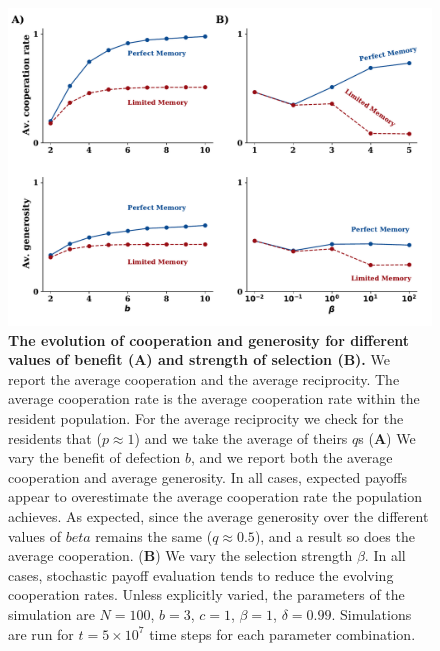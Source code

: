 \documentclass[11pt]{article}
\theoremstyle{plainCl1}
\theoremstyle{plainCl2}
\begin{document}
\begin{figure}[!htbp]
    \centering
    \includegraphics[width=\textwidth]{static/cooperation_rate_over_b_and_beta.pdf}
    \caption{{\bf The evolution of cooperation and generosity for different values
    of benefit (A) and strength of selection (B).} We report the
    average cooperation and the average reciprocity. The average cooperation rate
    is the average cooperation rate
    within the resident population. For the average reciprocity we check for the
    residents that ($p \approx 1$) and we take the average of theirs $q$s ({\bf A})
    We vary the benefit of defection $b$, and we report both the average
    cooperation and average generosity. In all cases, expected payoffs appear to
    overestimate the average cooperation rate the population achieves. As
    expected, since the average generosity over the different values of $beta$
    remains the same ($q \approx 0.5$), and a result so does the average
    cooperation. ({\bf B}) We vary the selection strength $\beta$. In all
    cases, stochastic payoff evaluation tends to reduce the evolving cooperation
    rates. Unless explicitly varied, the parameters of the simulation are
    $N\!=\!100$, $b\!=\!3$, $c\!=\!1$, $\beta\!=\!1$, $\delta\!=\!0.99$.
    Simulations are run for $t\!=\!5\times 10^7$ time steps for each parameter
    combination.}\label{fig:cooperation_rate_over_benefit_and_beta}
\end{figure}
\end{document}
